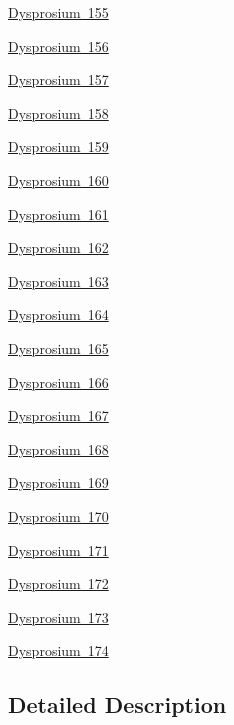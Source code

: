 \begin{DoxyCompactItemize}
\item 
\mbox{\hyperlink{group___isotope_const-_dysprosium-_dy155}{Dysprosium 155}}
\item 
\mbox{\hyperlink{group___isotope_const-_dysprosium-_dy156}{Dysprosium 156}}
\item 
\mbox{\hyperlink{group___isotope_const-_dysprosium-_dy157}{Dysprosium 157}}
\item 
\mbox{\hyperlink{group___isotope_const-_dysprosium-_dy158}{Dysprosium 158}}
\item 
\mbox{\hyperlink{group___isotope_const-_dysprosium-_dy159}{Dysprosium 159}}
\item 
\mbox{\hyperlink{group___isotope_const-_dysprosium-_dy160}{Dysprosium 160}}
\item 
\mbox{\hyperlink{group___isotope_const-_dysprosium-_dy161}{Dysprosium 161}}
\item 
\mbox{\hyperlink{group___isotope_const-_dysprosium-_dy162}{Dysprosium 162}}
\item 
\mbox{\hyperlink{group___isotope_const-_dysprosium-_dy163}{Dysprosium 163}}
\item 
\mbox{\hyperlink{group___isotope_const-_dysprosium-_dy164}{Dysprosium 164}}
\item 
\mbox{\hyperlink{group___isotope_const-_dysprosium-_dy165}{Dysprosium 165}}
\item 
\mbox{\hyperlink{group___isotope_const-_dysprosium-_dy166}{Dysprosium 166}}
\item 
\mbox{\hyperlink{group___isotope_const-_dysprosium-_dy167}{Dysprosium 167}}
\item 
\mbox{\hyperlink{group___isotope_const-_dysprosium-_dy168}{Dysprosium 168}}
\item 
\mbox{\hyperlink{group___isotope_const-_dysprosium-_dy169}{Dysprosium 169}}
\item 
\mbox{\hyperlink{group___isotope_const-_dysprosium-_dy170}{Dysprosium 170}}
\item 
\mbox{\hyperlink{group___isotope_const-_dysprosium-_dy171}{Dysprosium 171}}
\item 
\mbox{\hyperlink{group___isotope_const-_dysprosium-_dy172}{Dysprosium 172}}
\item 
\mbox{\hyperlink{group___isotope_const-_dysprosium-_dy173}{Dysprosium 173}}
\item 
\mbox{\hyperlink{group___isotope_const-_dysprosium-_dy174}{Dysprosium 174}}
\end{DoxyCompactItemize}


\subsection{Detailed Description}
